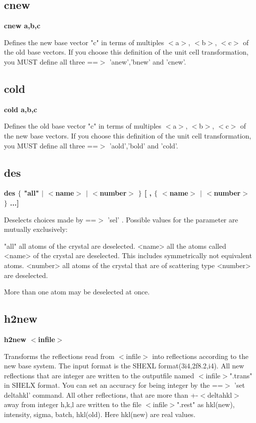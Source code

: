 \subsection*{cnew}
{\bf cnew a,b,c \par }
\par
\vspace{3pt}
Defines the new base vector "c" in terms of multiples $ <$a$> $, $ <$b$> $, $ <$c$> $ of 
the old base vectors. 
If you choose this definition of the unit cell transformation, you MUST 
define all three ==$> $ 'anew','bnew' and 'cnew'. 
\subsection*{cold}
{\bf cold a,b,c \par }
\par
\vspace{3pt}
Defines the old base vector "c" in terms of multiples $ <$a$> $, $ <$b$> $, $ <$c$> $ of 
the new base vectors. 
If you choose this definition of the unit cell transformation, you MUST 
define all three ==$> $ 'aold','bold' and 'cold'. 
\subsection*{des}
{\bf des $ \{$ "all" $| $ $ <$name$> $ $| $ $ <$number$> $ $\} $ [ , $ \{$ $ <$name$> $ $| $ $ <$number$> $ $\} $ ...] \par }
\par
\vspace{3pt}
Deselects choices made by ==$> $ 'sel' . Possible values 
for the parameter are mutually exclusively: 
\par
\begin{MacVerbatim}
"all"     all atoms of the crystal are deselected.
<name>    all the atoms called <name> of the crystal are deselected.
          This includes symmetrically not equivalent atoms.
<number>  all atoms of the crystal that are of scattering type <number>
          are deselected.
\end{MacVerbatim}
More than one atom may be deselected at once. 
\subsection*{h2new}
{\bf h2new $ <$infile$> $ \par }
\par
\vspace{3pt}
Transforms the reflections read from $ <$infile$> $ into reflections according 
to the new base system. The input format is the SHEXL format(3i4,2f8.2,i4). 
All new reflections that are integer are written to the outputfile 
named $ <$infile$> $".trans" in SHELX format. You can set an accuracy for 
being integer by the ==$> $ 'set deltahkl' command. All other reflections, 
that are more than +-$ <$deltahkl$> $ away from integer h,k,l are written to 
the file $ <$infile$> $".rest" as hkl(new), intensity, sigma, batch, hkl(old). 
Here hkl(new) are real values. 
